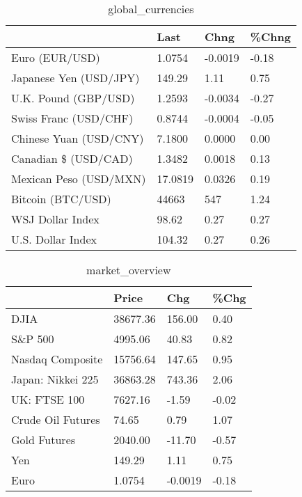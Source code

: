 \documentclass{article}%
\begin{document}
%


\begin{table}[htbp]%
\caption{global\_currencies}%
\centering%
\begin{adjustbox}{width=1\textwidth}%
\begin{tabular}{llll}
\toprule
                       &    Last &    Chng & \%Chng \\
\midrule
        Euro (EUR/USD) &  1.0754 & -0.0019 & -0.18 \\
Japanese Yen (USD/JPY) &  149.29 &    1.11 &  0.75 \\
  U.K. Pound (GBP/USD) &  1.2593 & -0.0034 & -0.27 \\
 Swiss Franc (USD/CHF) &  0.8744 & -0.0004 & -0.05 \\
Chinese Yuan (USD/CNY) &  7.1800 &  0.0000 &  0.00 \\
  Canadian \$ (USD/CAD) &  1.3482 &  0.0018 &  0.13 \\
Mexican Peso (USD/MXN) & 17.0819 &  0.0326 &  0.19 \\
     Bitcoin (BTC/USD) &   44663 &     547 &  1.24 \\
      WSJ Dollar Index &   98.62 &    0.27 &  0.27 \\
     U.S. Dollar Index &  104.32 &    0.27 &  0.26 \\
\bottomrule
\end{tabular}
%
\end{adjustbox}%
\end{table}

%


\begin{table}[htbp]%
\caption{market\_overview}%
\centering%
\begin{adjustbox}{width=1\textwidth}%
\begin{tabular}{llll}
\toprule
                  &    Price &     Chg &  \%Chg \\
\midrule
             DJIA & 38677.36 &  156.00 &  0.40 \\
          S\&P 500 &  4995.06 &   40.83 &  0.82 \\
 Nasdaq Composite & 15756.64 &  147.65 &  0.95 \\
Japan: Nikkei 225 & 36863.28 &  743.36 &  2.06 \\
     UK: FTSE 100 &  7627.16 &   -1.59 & -0.02 \\
Crude Oil Futures &    74.65 &    0.79 &  1.07 \\
     Gold Futures &  2040.00 &  -11.70 & -0.57 \\
              Yen &   149.29 &    1.11 &  0.75 \\
             Euro &   1.0754 & -0.0019 & -0.18 \\
\bottomrule
\end{tabular}
%
\end{adjustbox}%
\end{table}

%
\end{document}
